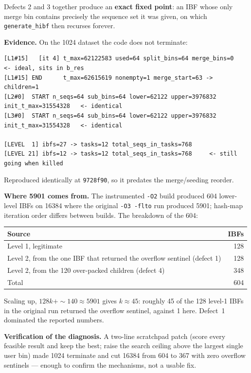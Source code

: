 \documentclass[11pt,a4paper]{article}
\newcommand{\code}[1]{\lstinline[basicstyle=\ttfamily\small]!#1!}
\newcommand{\sha}[1]{\texttt{#1}}
\begin{document}
Defects 2 and 3 together produce an \textbf{exact fixed point}: an IBF whose only merge bin
contains precisely the sequence set it was given, on which \code{generate_hibf} then recurses
forever.

\medskip\noindent\textbf{Evidence.} On the 1024 dataset the code does not terminate:

\begin{lstlisting}[style=codestyle]
[L1#15]   [it 4] t_max=62122583 used=64 split_bins=64 merge_bins=0   <- ideal, sits in b_res
[L1#15] END      t_max=62615619 nonempty=1 merge_start=63 -> children=1
[L2#0]  START n_seqs=64 sub_bins=64 lower=62122 upper=3976832 init_t_max=31554328   <- identical
[L3#0]  START n_seqs=64 sub_bins=64 lower=62122 upper=3976832 init_t_max=31554328   <- identical

[LEVEL  1] ibfs=27 -> tasks=12 total_seqs_in_tasks=768
[LEVEL 21] ibfs=12 -> tasks=12 total_seqs_in_tasks=768     <- still going when killed
\end{lstlisting}

\noindent Reproduced identically at \sha{9728f90}, so it predates the merge/seeding reorder.

\medskip\noindent\textbf{Where 5901 comes from.} The instrumented \texttt{-O2} build produced 604
lower-level IBFs on 16384 where the original \texttt{-O3 -flto} run produced 5901; hash-map
iteration order differs between builds. The breakdown of the 604:

\begin{longtable}{@{}p{11cm}r@{}}
\toprule
\textbf{Source} & \textbf{IBFs} \\
\midrule
Level 1, legitimate & 128 \\
Level 2, from the one IBF that returned the overflow sentinel (defect 1) & 128 \\
Level 2, from the 120 over-packed children (defect 4) & 348 \\
\midrule
Total & 604 \\
\bottomrule
\end{longtable}

\noindent Scaling up, $128k + {\sim}140 \approx 5901$ gives $k \approx 45$: roughly 45 of the 128
level-1 IBFs in the original run returned the overflow sentinel, against 1 here. Defect~1
dominated the reported numbers.

\medskip\noindent\textbf{Verification of the diagnosis.} A two-line scratchpad patch (score every
feasible result and keep the best; raise the search ceiling above the largest single user bin)
made 1024 terminate and cut 16384 from 604 to 367 with zero overflow sentinels --- enough to
confirm the mechanisms, not a usable fix.
\end{document}
